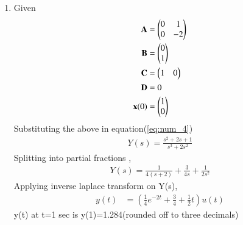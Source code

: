 \begin{enumerate}[label=\thesubsection.\arabic*.,ref=\thesubsection.\theenumi]
\item Given
\begin{align}
\mathbf{A}&=\begin{pmatrix}0&1\\0&-2\end{pmatrix}\\
\mathbf{B}&=\begin{pmatrix}0\\1\end{pmatrix}\\
\mathbf{C}&=\begin{pmatrix}1&0\end{pmatrix}\\
\mathbf{D}&=0\\
\mathbf{x}(0)&=\begin{pmatrix}1\\0\end{pmatrix}
\end{align}
Substituting the above in equation(\ref{eq:num_4})
\begin{align}
{Y}(s)=\frac{s^{2}+2s+1}{s^{3}+2s^{2}}
\end{align}
Splitting into partial fractions ,
\begin{align}
{Y}(s)=\frac{1}{4(s+2)}+\frac{3}{4s}+\frac{1}{2s^{2}}
\end{align}
Applying inverse laplace transform on Y(s),
\begin{align}
y(t)&=(\frac{1}{4}e^{-2t}+\frac{3}{4}+\frac{1}{2}t)u(t)
\end{align}
y(t) at t=1 sec is
y(1)=1.284(rounded off to three decimals)

\end{enumerate}
